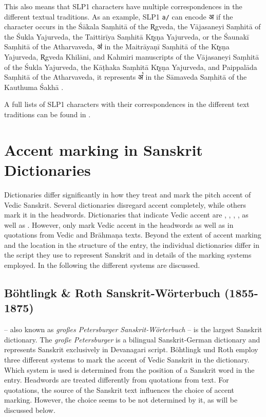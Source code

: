 This also means that SLP1 characters have multiple correspondences in the different textual traditions. As an example, SLP1 \texttt{a/} \citep[p.~162; also SLP2 002]{ScharfHyman2011} can encode {\devfont अ} if the character occurs in the Śākala Saṃhitā of the R̥gveda, the Vājasaneyi Saṃhitā of the Śukla Yajurveda, the Taittirīya Saṃhitā Kr̥ṣṇa Yajurveda, or the Śaunakī Saṃhitā of the Atharvaveda, {\devfont अ॑} in the Maitrāyaṇī Saṃhitā of the Kr̥ṣṇa Yajurveda, R̥gveda Khilāni, and Kahmiri manuscripts of the Vājasaneyi Saṃhitā of the Śukla Yajurveda, the Kāṭhaka Saṃhitā Kr̥ṣṇa Yajurveda, and Paippalāda Saṃhitā of the Atharvaveda, it represents {\devfont अ꣡} in the Sāmaveda Saṃhitā of the Kauthuma Śakhā \citep[p.~162]{ScharfHyman2011}. 

A full lists of SLP1 characters with their correspondences in the different text traditions can be found in \citet[p.~162-203; also SLP2 002]{ScharfHyman2011}.

\chapter{Accent marking in Sanskrit Dictionaries}

Dictionaries differ significantly in how they treat and mark the pitch accent of Vedic Sanskrit. Several dictionaries disregard accent completely, while others mark it in the headwords. Dictionaries that indicate Vedic accent are \citet{pwg}, \citet{gra}, \citet{pw}, \citet{ccs,cae}, as well as \citet{mw}. However, only \citet{pwg} mark Vedic accent in the headwords as well as in quotations from Vedic and Brāhmaṇa texts. Beyond the extent of accent marking and the location in the structure of the entry, the individual dictionaries differ in the script they use to represent Sanskrit and in details of the marking systems employed. In the following the different systems are discussed.

\section{Böhtlingk \& Roth Sanskrit-Wörterbuch (1855-1875)}

\citet{pwg} – also known as \emph{großes Petersburger Sanskrit-Wörterbuch} – is the largest Sanskrit dictionary. The \emph{große Petersburger} is a bilingual Sanskrit-German dictionary and represents Sanskrit exclusively in Devanagari script. Böhtlingk und Roth employ three different systems to mark the accent of Vedic Sanskrit in the dictionary. Which system is used is determined from the position of a Sanskrit word in the entry. Headwords are treated differently from quotations from text. For quotations, the source of the Sanskrit text influences the choice of accent marking. However, the choice seems to be not determined by it, as will be discussed below.

